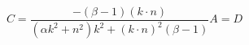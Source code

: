\begin{equation*}
C=\frac{-(\beta -1)(k\cdot n)}{(\alpha k^{2}+n^{2})k^{2}+(k\cdot
n)^{2}(\beta -1)}A=D
\end{equation*}


